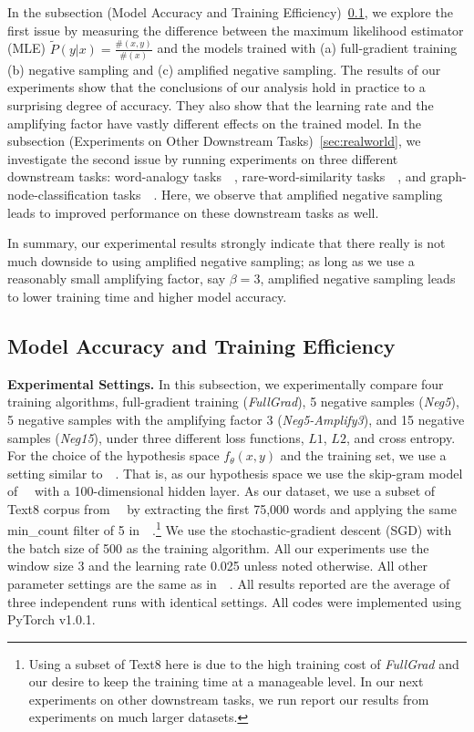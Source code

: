 In the subsection (Model Accuracy and Training Efficiency)~\ref{sec:simulation}, we explore the first issue by measuring the difference between the maximum likelihood estimator (MLE) $\tilde{P}(y|x) = \frac{\#(x,y)}{\#(x)}$ and the models trained with (a) full-gradient training (b) negative sampling and (c) amplified negative sampling. The results of our experiments show that the conclusions of our analysis hold in practice to a surprising degree of accuracy. They also show that the learning rate and the amplifying factor have vastly different effects on the trained model. In the subsection (Experiments on Other Downstream Tasks)~\ref{sec:realworld}, we investigate the second issue by running experiments on three different downstream tasks: word-analogy tasks~~\citep{mikolov2013efficient}, rare-word-similarity tasks~~\citep{fastText}, and graph-node-classification tasks~~\citep{node2vec-kdd2016}. Here, we observe that amplified negative sampling leads to improved performance on these  downstream tasks as well. 


In summary, our experimental results strongly indicate that there really is not much downside to using amplified negative sampling; as long as we use a reasonably small amplifying factor, say $\beta = 3$, amplified negative sampling leads to lower training time and higher model accuracy.

\subsection{Model Accuracy and Training Efficiency}\label{sec:simulation}

\textbf{Experimental Settings.} 
In this subsection, we experimentally compare four training algorithms, full-gradient training (\textit{FullGrad}), 5 negative samples (\textit{Neg5}), 5 negative samples with the amplifying factor 3 (\textit{Neg5-Amplify3}), and 15 negative samples (\textit{Neg15}),
under three different loss functions, $L1$, $L2$, and cross entropy. For the choice of the hypothesis space $f_{\theta}(x,y)$ and the training set, we use a setting similar to~~\citep{mikolov2013efficient}. That is, as our hypothesis space we use the skip-gram model of~~\citep{mikolov2013efficient} with a 100-dimensional hidden layer.
As our dataset, we use a subset of Text8 corpus from~~\citep{mikolov2013efficient} by extracting the first 75,000 words and applying the same min\_count filter of 5 in~~\citep{mikolov2013efficient}.\footnote{Using a subset of Text8 here is due to the high training cost of \textit{FullGrad} and our desire to keep the training time at a manageable level. In our next experiments on other downstream tasks, we run report our results from experiments on much larger datasets.} We use the stochastic-gradient descent (SGD) with the batch size of 500 as the training algorithm. All our experiments use the window size 3 and the learning rate 0.025 unless noted otherwise. All other parameter settings are the same as in~~\citep{mikolov2013efficient}. All results reported are the average of three independent runs with identical settings. All codes were implemented using PyTorch v1.0.1. 

